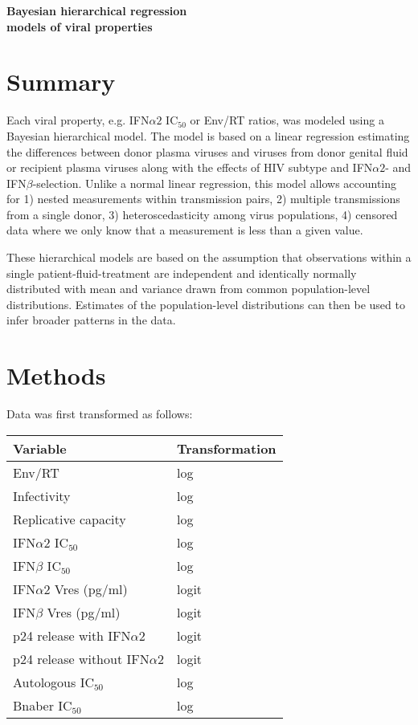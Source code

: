 \documentclass[12pt]{article}
\newcommand{\ifna}{IFN${\alpha 2}$}
\newcommand{\ifnb}{IFN${\beta}$}
\newcommand{\icFifty}{IC$_{50}$}
\begin{document}
\begin{center}
 \Large\textbf{Bayesian hierarchical regression\\ models of viral properties}
\end{center}
\section*{Summary}
Each viral property, e.g. \ifna{} \icFifty{} or Env/RT ratios, was modeled using a Bayesian hierarchical model.
  The model is based on a linear regression estimating the differences between
  donor plasma viruses and viruses from donor genital fluid or recipient plasma viruses along with the effects of HIV subtype and \ifna{}- and \ifnb{}-selection.
  Unlike a normal linear regression, this model allows accounting for
  1) nested measurements within transmission pairs,
  2) multiple transmissions from a single donor,
  3) heteroscedasticity among virus populations, 
  4) censored data where we only know that a measurement is less than a given value.

These hierarchical models are based on the assumption that observations within a single patient-fluid-treatment
  are independent and identically normally distributed with mean and variance drawn from common population-level distributions.
  Estimates of the population-level distributions can then be used to infer broader patterns in the data.

\section*{Methods}

Data was first transformed as follows:

\begin{table}[ht]
\centering
\begin{tabular}{|l|l|}
      \hline
      Variable                    & Transformation \\ 
      \hline
      Env/RT                      & log            \\ 
      Infectivity                 & log            \\ 
      Replicative capacity        & log            \\ 
      \ifna{} \icFifty{}          & log            \\ 
      \ifnb{} \icFifty{}          & log            \\ 
      \ifna{} Vres (pg/ml)        & logit          \\ 
      \ifnb{} Vres (pg/ml)        & logit          \\ 
      p24 release with \ifna{}    & logit          \\ 
      p24 release without \ifna{} & logit          \\ 
      Autologous \icFifty{}       & log            \\ 
      Bnaber \icFifty{}           & log            \\ 
      \hline
\end{tabular}
\end{table}
\end{document}
